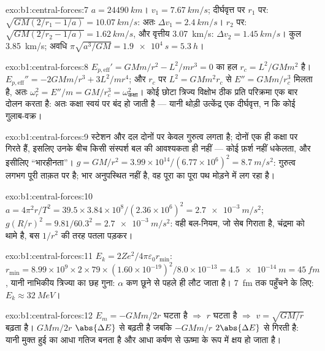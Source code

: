 \begin{solution}{exo:b1:central-forces:7}
$a = \qty{24490}{km}$। $v_1 = \qty{7.67}{km/s}$; दीर्घवृत्त पर $r_1$ पर:
$\sqrt{GM(2/r_1 - 1/a)} = \qty{10.07}{km/s}$: अतः $\Delta v_1 = \qty{2.4}{km/s}$।
$r_2$ पर: $\sqrt{GM(2/r_2 - 1/a)} = \qty{1.62}{km/s}$, और वृत्तीय
\qty{3.07}{km/s}: $\Delta v_2 = \qty{1.45}{km/s}$। कुल \qty{3.85}{km/s};
अवधि $\pi\sqrt{a^3/GM} = \qty{1.9e4}{s} = \qty{5.3}{h}$।
\end{solution}

\begin{solution}{exo:b1:central-forces:8}
$E_{p,\mathrm{eff}}' = GMm/r^2 - L^2/mr^3 = 0$ का हल $r_c = L^2/GMm^2$ है।
$E_{p,\mathrm{eff}}'' = -2GMm/r^3 + 3L^2/mr^4$; और $r_c$ पर $L^2 = GMm^2r_c$
से $E'' = GMm/r_c^3$ मिलता है, अतः $\omega_r^2 = E''/m = GM/r_c^3 = \omega_{\text{कक्षा}}^2$।
कोई छोटा त्रिज्य विक्षोभ ठीक प्रति परिक्रमा एक बार दोलन करता है: अतः कक्षा
स्वयं पर बंद हो जाती है --- यानी थोड़ी उत्केंद्र एक दीर्घवृत्त, न कि कोई
गुलाब-वक्र।
\end{solution}

\begin{solution}{exo:b1:central-forces:9}
स्टेशन और दल दोनों पर केवल गुरुत्व लगता है; दोनों एक ही कक्षा पर गिरते हैं,
इसलिए उनके बीच किसी संस्पर्श बल की आवश्यकता ही नहीं --- कोई फ़र्श नहीं
धकेलता, और इसीलिए ``भारहीनता''। $g = GM/r^2 = 3.99\times10^{14}/(6.77\times10^6)^2
= \qty{8.7}{m/s^2}$: गुरुत्व लगभग पूरी ताक़त पर है; भार अनुपस्थित नहीं है,
वह पूरा का पूरा पथ मोड़ने में लग रहा है।
\end{solution}

\begin{solution}{exo:b1:central-forces:10}
$a = 4\pi^2r/T^2 = 39.5 \times 3.84\times10^8/(2.36\times10^6)^2 =
\qty{2.7e-3}{m/s^2}$; $g(R/r)^2 = 9.81/60.3^2 = \qty{2.7e-3}{m/s^2}$: वही
बल-नियम, जो सेब गिराता है, चंद्रमा को थामे है, बस $1/r^2$ की तरह पतला पड़कर।
\end{solution}

\begin{solution}{exo:b1:central-forces:11}
$E_k = 2Ze^2/4\pi\varepsilon_0r_{\min}$: $r_{\min} = 8.99\times10^9 \times 2 \times 79
\times (1.60\times10^{-19})^2/8.0\times10^{-13} = \qty{4.5e-14}{m} = \qty{45}{fm}$,
यानी नाभिकीय त्रिज्या का छह गुना: $\alpha$ कण छूने से पहले ही लौट जाता है।
\qty{7}{fm} तक पहुँचने के लिए: $E_k \approx \qty{32}{MeV}$।
\end{solution}

\begin{solution}{exo:b1:central-forces:12}
$E_m = -GMm/2r$ घटता है $\Rightarrow$ $r$ घटता है $\Rightarrow$ $v =
\sqrt{GM/r}$ बढ़ता है।  $GMm/2r$ $\abs{\Delta E}$ से बढ़ती है
जबकि  $-GMm/r$ $2\abs{\Delta E}$ से गिरती है: यानी मुक्त हुई
 का आधा गतिज बनता है और आधा कर्षण से ऊष्मा के रूप में क्षय
हो जाता है।
\end{solution}

